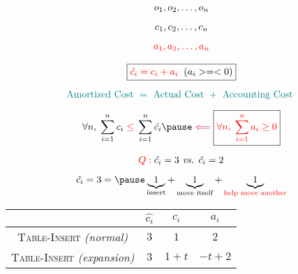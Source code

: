 
\begin{frame}{}
  \centerline{}

  \vspace{0.50cm}
\end{frame}

\begin{frame}{}
  \begin{gather*}
    o_1, o_2, \ldots, o_n \\[5pt]
    c_1, c_2, \ldots, c_n \\[5pt]
    \textcolor{red}{a_1, a_2, \ldots, a_n}
  \end{gather*}

  \pause
  \vspace{-0.30cm}
  \[
    \boxed{\textcolor{red}{\hat{c_i} = c_i + a_i} \;\; (a_i >=< 0)}
  \]

  \[
    \textcolor{teal}{\text{Amortized Cost } = \text{ Actual Cost } + \text{ Accounting Cost }}
  \]

  \pause
  \[
    \forall n,\; \sum_{i=1}^{n} c_i \red{\;\le\;} \sum_{i=1}^{n} \hat{c_i} \pause 
    \;\purple{\Longleftarrow}\; \boxed{\red{\forall n,\; \sum_{i=1}^{n} a_i \geq 0}}
  \]

  \pause
  \begin{center}
    {\large {}}
  \end{center}
\end{frame}

\begin{frame}{}
  \centerline{}

  \[
    \textcolor{red}{Q:}\; \hat{c_i} = 3 \text{\emph{ vs. }} \hat{c_i} = 2
  \]

  \pause
  \[
    \hat{c_i} = 3 = \pause
    \underbrace{1}_{\textrm{insert}} + \underbrace{1}_{\textrm{move itself}} + \underbrace{1}_{\textrm{\red{help move another}}}
  \]

  \pause
  \vspace{0.30cm}
  \begin{table}
    \begin{tabular}{c|ccc}
      & $\hat{c_i}$ & $c_i$ & $a_i$
      \\ \hline
      \textsc{Table-Insert} \textsl{(normal)} & $3$ & $1$ & $2$\\
      \textsc{Table-Insert} \textsl{(expansion)} & $3$ & $1 + t$ & $-t + 2$
    \end{tabular}
  \end{table}
\end{frame}
